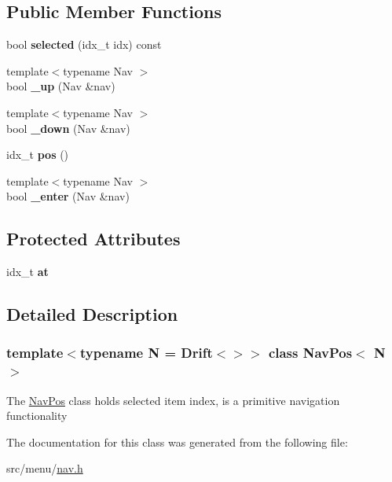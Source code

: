 \subsection*{Public Member Functions}
\begin{DoxyCompactItemize}
\item 
\mbox{\label{classNavPos_aebf5c7e017a6bccc4e8a1a87a790397e}} 
bool {\bfseries selected} (idx\+\_\+t idx) const
\item 
\mbox{\label{classNavPos_ae26c7ff5d2fb3e0469daacccea51e49e}} 
{\footnotesize template$<$typename Nav $>$ }\\bool {\bfseries \+\_\+up} (Nav \&nav)
\item 
\mbox{\label{classNavPos_a913487df01cc3893305d5ccd221d7c7a}} 
{\footnotesize template$<$typename Nav $>$ }\\bool {\bfseries \+\_\+down} (Nav \&nav)
\item 
\mbox{\label{classNavPos_a13da58ac811c5308ec0e6024774701b7}} 
idx\+\_\+t {\bfseries pos} ()
\item 
\mbox{\label{classNavPos_aadbd4f1de82dbb156f90e90f8b196698}} 
{\footnotesize template$<$typename Nav $>$ }\\bool {\bfseries \+\_\+enter} (Nav \&nav)
\end{DoxyCompactItemize}
\subsection*{Protected Attributes}
\begin{DoxyCompactItemize}
\item 
\mbox{\label{classNavPos_a99798e57e3b5333836e570d125a6ebed}} 
idx\+\_\+t {\bfseries at}
\end{DoxyCompactItemize}


\subsection{Detailed Description}
\subsubsection*{template$<$typename N = Drift$<$$>$$>$\newline
class Nav\+Pos$<$ N $>$}

The \hyperlink{classNavPos}{Nav\+Pos} class holds selected item index, is a primitive navigation functionality 

The documentation for this class was generated from the following file\+:\begin{DoxyCompactItemize}
\item 
src/menu/\hyperlink{nav_8h}{nav.\+h}\end{DoxyCompactItemize}
